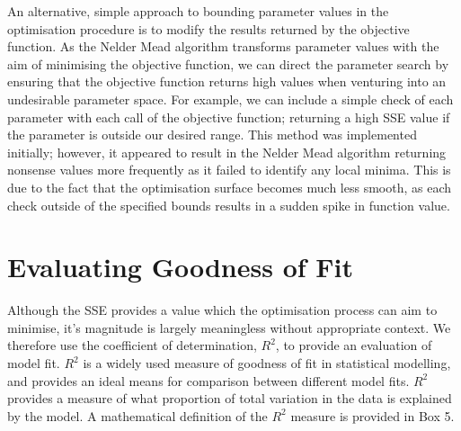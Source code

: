 An alternative, simple approach to bounding parameter values in the
optimisation procedure is to modify the results returned by the
objective function. As the Nelder Mead algorithm transforms parameter
values with the aim of minimising the objective function, we can
direct the parameter search by ensuring that the objective function
returns high values when venturing into an undesirable parameter
space. For example, we can include a simple check of each parameter
with each call of the objective function; returning a high SSE value
if the parameter is outside our desired range. This method was
implemented initially; however, it appeared to result in the Nelder
Mead algorithm returning nonsense values more frequently as it failed
to identify any local minima. This is due to the fact that the
optimisation surface becomes much less smooth, as each check outside
of the specified bounds results in a sudden spike in function value.  


\section{Evaluating Goodness of Fit}
Although the SSE provides a value which the optimisation process can
aim to minimise, it's magnitude is largely meaningless without
appropriate context. We therefore use the coefficient of
determination, $R^2$, to provide an evaluation of model fit. $R^2$ is
a widely used measure of goodness of fit in statistical modelling, and
provides an ideal means for comparison between different model
fits. $R^2$ provides a measure of what proportion of total variation
in the data is explained by the model. A mathematical definition of
the $R^2$ measure is provided in Box 5.

